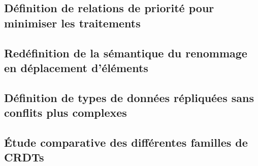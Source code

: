 \documentclass[12pt]{thesul}
\begin{document}
\subsection{Définition de relations de priorité pour minimiser les traitements}
\subsection{Redéfinition de la sémantique du renommage en déplacement d'éléments}
\subsection{Définition de types de données répliquées sans conflits plus complexes}

\subsection{Étude comparative des différentes familles de CRDTs}
\end{document}
